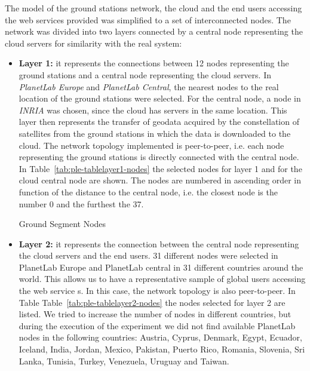The model of the ground stations network, the cloud and the end users accessing
the web services provided was simplified to a set of interconnected nodes. The
network was divided into two layers connected by a central node representing the
cloud servers for similarity with the real system: 
\begin{itemize}

\item \textbf{Layer 1:} it represents the connections between 12 nodes
  representing the ground stations and a central node representing the cloud
  servers. In \emph{PlanetLab Europe} and \emph{PlanetLab Central}, the nearest nodes to the
  real location of the ground stations were selected. For the central node, a
  node in \emph{INRIA} was chosen, since the \bonfire cloud has servers in the same
  location. This layer then represents the transfer of geodata acquired by the
  constellation of satellites from the ground stations in which the data is
  downloaded to the cloud. The network topology implemented is peer-to-peer,
  i.e. each node representing the ground stations is directly connected with the
  central node. In Table~\ref{tab:ple-tablelayer1-nodes} the \pl selected nodes for layer 1 and for the
  cloud central node are shown. The nodes are numbered in ascending order in
  function of the distance to the central node, i.e. the closest node is the
  number 0 and the furthest the 37. 

\begin{table}[hp]
  \centering
  {\small
  
  }
  \caption{Ground Segment Nodes}
  \label{tab:ple-tablelayer1-nodes}
\end{table}


\item \textbf{Layer 2:} it represents the connection between the central node
  representing the cloud servers and the end users. 31 different nodes were
  selected in PlanetLab Europe and PlanetLab central in 31 different countries
  around the world. This allows us to have a representative sample of global
  users accessing the web service
s. In this case, the network topology is also peer-to-peer. In Table Table~\ref{tab:ple-tablelayer2-nodes} the nodes selected for layer 2 are listed. We tried to increase the number of nodes in different countries, but during the execution of the experiment we did not find available PlanetLab nodes in the following countries: Austria, Cyprus, Denmark, Egypt, Ecuador, Iceland, India, Jordan, Mexico, Pakistan, Puerto Rico, Romania, Slovenia, Sri Lanka, Tunisia, Turkey, Venezuela, Uruguay and Taiwan. 
\end{itemize}



